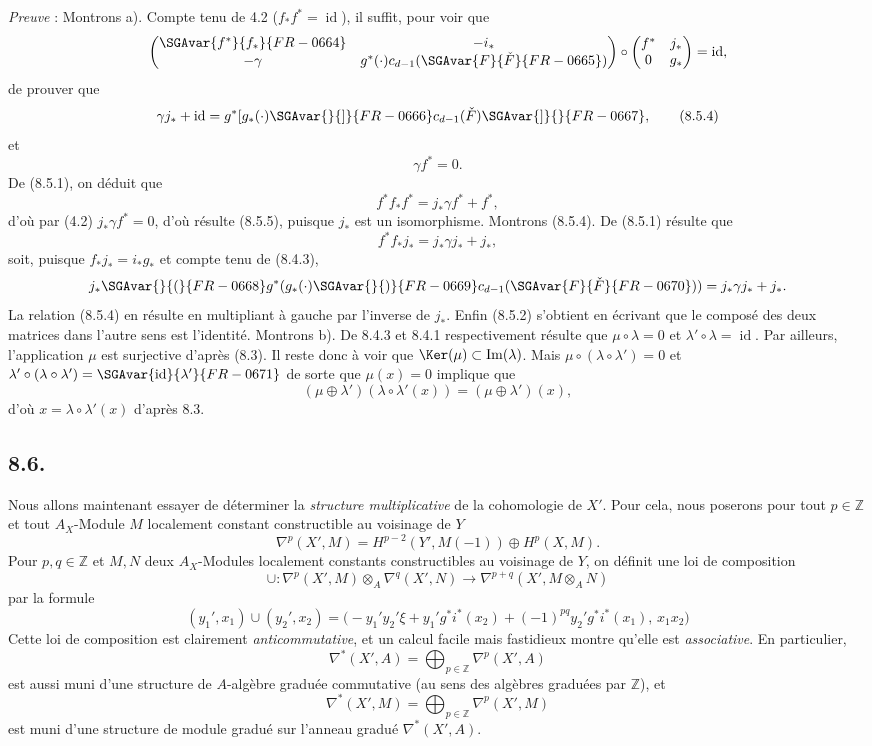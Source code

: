 \emph{Preuve} : Montrons a). Compte tenu de 4.2 ($f_*f^*=\operatorname{id}$), il suffit, pour voir que
\[
\begin{pmatrix}
\SGAvar{f^*}{f_*}{FR-0664}&-i_*\\
-\gamma&g^*(\cdot)c_{d-1}(\SGAvar{F}{\check F}{FR-0665})
\end{pmatrix}
\circ
\begin{pmatrix}
f^*&j_*\\
0&g_*
\end{pmatrix}
=\operatorname{id},
\]
de prouver que
\[
\gamma j_*+\operatorname{id}=g^*[g_*(\cdot)\SGAvar{}{]}{FR-0666}c_{d-1}(\check F)\SGAvar{]}{}{FR-0667},
\tag{8.5.4}
\]
et
\[
\gamma f^*=0.
\tag{8.5.5}
\]
De (8.5.1), on déduit que
\[
f^*f_*f^*=j_*\gamma f^*+f^*,
\]
d'où par (4.2) $j_*\gamma f^*=0$, d'où résulte (8.5.5), puisque $j_*$ est un isomorphisme. Montrons (8.5.4). De (8.5.1) résulte que
\[
f^*f_*j_*=j_*\gamma j_*+j_*,
\]
soit, puisque $f_*j_*=i_*g_*$ et compte tenu de (8.4.3),
\[
j_*\SGAvar{}{(}{FR-0668}g^*(g_*(\cdot)\SGAvar{}{)}{FR-0669}c_{d-1}(\SGAvar{F}{\check F}{FR-0670}))=j_*\gamma j_*+j_*.
\]
La relation (8.5.4) en résulte en multipliant à gauche par l'inverse de $j_*$. Enfin (8.5.2) s'obtient en écrivant que le composé des deux matrices dans l'autre sens est l'identité. Montrons b). De 8.4.3 et 8.4.1 respectivement résulte que $\mu\circ\lambda=0$ et $\lambda'\circ\lambda=\operatorname{id}$. Par ailleurs, l'application $\mu$ est surjective d'après (8.3). Il reste donc à voir que $\Ker(\mu)\subset\operatorname{Im}(\lambda)$. Mais $\mu\circ(\lambda\circ\lambda')=0$ et $\lambda'\circ(\lambda\circ\lambda')=\SGAvar{\operatorname{id}}{\lambda'}{FR-0671}$ de sorte que $\mu(x)=0$ implique que
\[
(\mu\oplus\lambda')(\lambda\circ\lambda'(x))=(\mu\oplus\lambda')(x),
\]
d'où $x=\lambda\circ\lambda'(x)$ d'après 8.3.

\subsection*{8.6.}

Nous allons maintenant essayer de déterminer la \emph{structure multiplicative} de la cohomologie de $X'$. Pour cela, nous poserons pour tout $p\in\mathbb{Z}$ et tout $A_X$-Module $M$ localement constant constructible au voisinage de $Y$
\[
\nabla^p(X',M)=H^{p-2}(Y',M(-1))\oplus H^p(X,M).
\]
Pour $p,q\in\mathbb{Z}$ et $M,N$ deux $A_X$-Modules localement constants constructibles au voisinage de $Y$, on définit une loi de composition
\[
\cup:\nabla^p(X',M)\otimes_A\nabla^q(X',N)\to
\nabla^{p+q}(X',M\otimes_A N)
\tag{8.6.1}
\]
par la formule
\[
(y_1',x_1)\cup(y_2',x_2)=
\bigl(-y_1'y_2'\xi+y_1'g^*i^*(x_2)+(-1)^{pq}y_2'g^*i^*(x_1),\,x_1x_2\bigr)
\tag{8.6.2}
\]
Cette loi de composition est clairement \emph{anticommutative}, et un calcul facile mais fastidieux montre qu'elle est \emph{associative}. En particulier,
\[
\nabla^*(X',A)=\bigoplus_{p\in\mathbb{Z}}\nabla^p(X',A)
\]
est
aussi muni d'une structure de $A$-algèbre graduée commutative (au sens des algèbres graduées par $\mathbb{Z}$), et
\[
\nabla^*(X',M)=\bigoplus_{p\in\mathbb{Z}}\nabla^p(X',M)
\]
est muni d'une structure de module gradué sur l'anneau gradué $\nabla^*(X',A)$.

